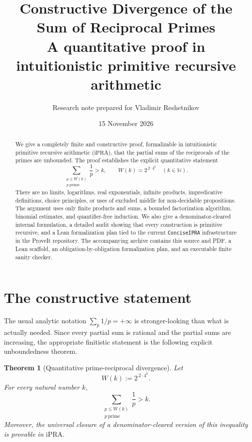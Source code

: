\documentclass[11pt]{article}
\title{\textbf{Constructive Divergence of the Sum of Reciprocal Primes}\\
       \large A quantitative proof in intuitionistic primitive recursive arithmetic}
\author{Research note prepared for Vladimir Reshetnikov}
\date{15 November 2026}
\newtheorem{theorem}{Theorem}[section]
\theoremstyle{definition}
\newcommand{\N}{\mathbb{N}}
\newcommand{\ipra}{\mathrm{iPRA}}
\newcommand{\Wit}{W}
\newcommand{\code}[1]{\texttt{#1}}
\begin{document}
\maketitle

\begin{abstract}
We give a completely finite and constructive proof, formalizable in
intuitionistic primitive recursive arithmetic (\(\ipra\)), that the partial
sums of the reciprocals of the primes are unbounded.  The proof establishes
the explicit quantitative statement
\[
  \sum_{\substack{p\leq \Wit(k)\\p\ \mathrm{prime}}}\frac1p>k,
  \qquad
  \Wit(k)=2^{\,2\cdot 4^k}
  \quad(k\in\N).
\]
There are no limits, logarithms, real exponentials, infinite products,
impredicative definitions, choice principles, or uses of excluded middle for
non-decidable propositions.  The argument uses only finite products and sums,
a bounded factorization algorithm, binomial estimates, and quantifier-free
induction.  We also give a denominator-cleared internal formulation, a
detailed audit showing that every construction is primitive recursive, and a
Lean formalization plan tied to the current \code{ConciseIPRA} infrastructure
in the ProveIt repository.  The accompanying archive contains this source and
PDF, a Lean scaffold, an obligation-by-obligation formalization plan, and an
executable finite sanity checker.
\end{abstract}

\tableofcontents

\section{The constructive statement}

The usual analytic notation
\(
  \sum_p 1/p=+\infty
\)
is stronger-looking than what is actually needed.  Since every partial sum is
rational and the partial sums are increasing, the appropriate finitistic
statement is the following explicit unboundedness theorem.

\begin{theorem}[Quantitative prime-reciprocal divergence]\label{thm:main}
Let
\[
  \Wit(k):=2^{\,2\cdot 4^k}.
\]
For every natural number \(k\),
\[
  \sum_{\substack{p\leq \Wit(k)\\p\ \mathrm{prime}}}\frac1p>k.
\]
Moreover, the universal closure of a denominator-cleared version of this
inequality is provable in \(\ipra\).
\end{theorem}
\end{document}
